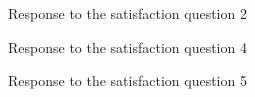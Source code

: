 \documentclass[12pt,oneside,openright,a4paper]{cpe-english-project}
\begin{document}
\begin{figure}[!h]\centering {} \caption{Response to the satisfaction question 2} \end{figure}
\begin{figure}[!h]\centering {} \caption{Response to the satisfaction question 4} \end{figure}
\begin{figure}[!h]\centering {} \caption{Response to the satisfaction question 5} \end{figure}
\end{document}
